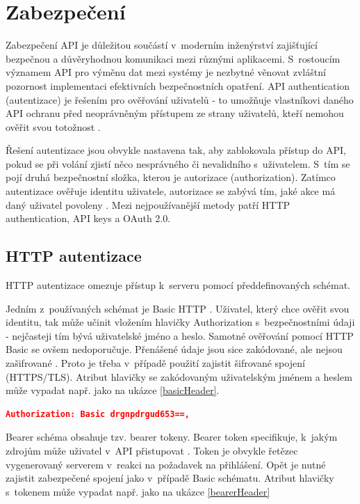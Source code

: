\documentclass[czech, bc, kiv, he, iso690numb]{fasthesis}
\begin{document}
%
%
\section{Zabezpečení}
Zabezpečení API je důležitou součástí v~moderním inženýrství zajišťující bezpečnou a důvěryhodnou komunikaci mezi různými aplikacemi. S~rostoucím významem API pro výměnu dat mezi
systémy je nezbytné věnovat zvláštní pozornost implementaci efektivních bezpečnostních opatření. API authentication (autentizace) je řešením pro ověřování uživatelů - to umožňuje
vlastníkovi daného API ochranu před neoprávněným přístupem ze strany uživatelů, kteří nemohou ověřit svou totožnost \cite{whatIsAPI}.

Řešení autentizace jsou obvykle nastavena tak, aby zablokovala přístup do API, pokud se při volání zjistí něco nesprávného či nevalidního s~uživatelem. S~tím se pojí druhá bezpečnostní
složka, kterou je autorizace (authorization). Zatímco autentizace ověřuje identitu uživatele, autorizace se zabývá tím, jaké akce má daný uživatel povoleny \cite{mostUsedAuthentication}. 
Mezi nejpoužívanější metody patří HTTP authentication, API keys a OAuth 2.0. 

\subsection{HTTP autentizace}
HTTP autentizace omezuje přístup k~serveru pomocí předdefinovaných schémat. 

Jedním z~používaných schémat je Basic HTTP \cite{mozillaHTTPAuth}. Uživatel, který chce ověřit svou identitu, tak může učinit vložením hlavičky 
Authorization s~bezpečnostními údaji - nejčasteji tím bývá uživatelské jméno a heslo. 
Samotné ověřování pomocí HTTP Basic se ovšem nedoporučuje. Přenášené údaje jsou sice zakódované, ale nejsou zašifrované \cite{mozillaHTTPAuth}. Proto je třeba v~případě použití zajistit šifrované spojení (HTTPS/TLS). Atribut hlavičky se zakódovaným uživatelským jménem a heslem může vypadat např. jako na ukázce \ref{basicHeader}.

\begin{lstlisting}[language=json, caption={Autorizační atribut - Basic schéma}, label=basicHeader]
	Authorization: Basic drgnpdrgud653==,
\end{lstlisting}

Bearer schéma obsahuje tzv. bearer tokeny. Bearer token specifikuje, k~jakým zdrojům může uživatel v~API přistupovat \cite{mostUsedAuthentication}. Token je obvykle řetězec vygenerovaný serverem v~reakci na požadavek na přihlášení. Opět je nutné zajistit zabezpečené spojení jako v~případě Basic schématu. Atribut hlavičky s~tokenem může vypadat např. jako na ukázce \ref{bearerHeader}
\end{document}

